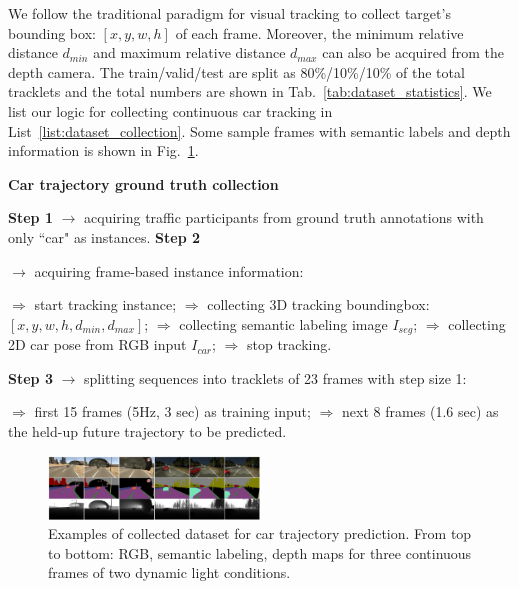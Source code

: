 \documentclass[10pt,twocolumn,letterpaper]{article}
\newlength\myindent
\newcommand\bindent[1][\myindent]{%
  \begingroup
  \setlength{\itemindent}{#1}
  \addtolength{\algorithmicindent}{#1}
}
\newcommand\eindent{\endgroup}
\begin{document}
We follow the traditional paradigm for visual tracking to collect target's bounding box: $[x, y, w, h]$ of each frame. Moreover, the minimum relative distance $d_{min}$ and maximum relative distance $d_{max}$ can also be acquired from the depth camera. The train/valid/test are split as 80\%/10\%/10\% of the total tracklets and the total numbers are shown in Tab.~\ref{tab:dataset_statistics}.
We list our logic for collecting continuous car tracking in List~\ref{list:dataset_collection}.
Some sample frames with semantic labels and depth information is shown in Fig.~\ref{fig:dataset}.


\begin{algorithm}[h]
\begin{algorithmic}
\caption{\textbf{Car trajectory ground truth collection}}\label{list:dataset_collection}
\STATE \textbf{Step 1} $\rightarrow $ acquiring traffic participants from ground truth annotations with only ``car" as instances.
\STATE \textbf{Step 2} {$\rightarrow $ acquiring frame-based instance information:
{
\bindent
    \STATE $\Rightarrow$ start tracking instance;
    \STATE $\Rightarrow$ collecting 3D tracking boundingbox: $[x, y, w, h, d_{min}, d_{max}]$;
    \STATE $\Rightarrow$ collecting semantic labeling image $I_{seg}$;
    \STATE $\Rightarrow$ collecting 2D car pose from RGB input $I_{car}$;
    \STATE $\Rightarrow$ stop tracking.
    \ENDIF\eindent}
  }
\STATE \textbf{Step 3} $\rightarrow $ splitting sequences into tracklets of 23 frames with step size 1:
{\bindent
    \STATE $\Rightarrow$  first 15 frames (5Hz, 3 sec) as training input;
  \STATE $\Rightarrow$  next 8 frames (1.6 sec) as the held-up future trajectory to be predicted.
  \eindent}

\end{algorithmic}
\end{algorithm}

\begin{figure}[t]
        \centering
        \includegraphics[width=0.5\textwidth]{figures/dataset.pdf}
        \caption{ {\small Examples of collected dataset for car trajectory prediction. From top to bottom: RGB, semantic labeling, depth maps for three continuous frames of two dynamic light conditions.}}
        \label{fig:dataset}
\end{figure}
\end{document}
